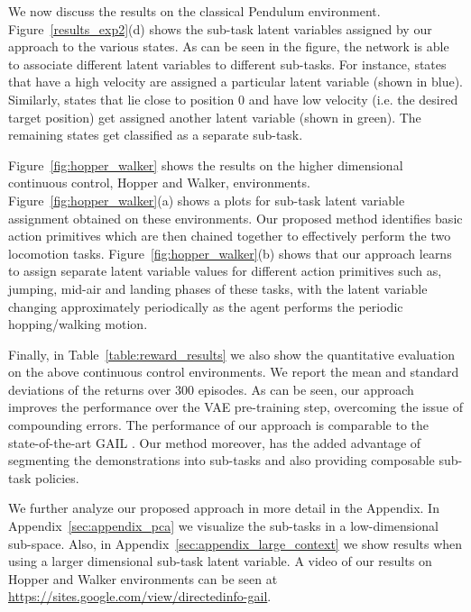\documentclass{article} %
\begin{document}
We now discuss the results on the classical Pendulum environment. Figure~\ref{results_exp2}(d) shows the sub-task latent variables assigned by our approach to the various states. As can be seen in the figure, the network is able to associate different latent variables to different sub-tasks. For instance, states that have a high velocity are assigned a particular latent variable (shown in blue). Similarly, states that lie close to position 0 and have low velocity (i.e. the desired target position) get assigned another latent variable (shown in green). The remaining states get classified as a separate sub-task.

Figure~\ref{fig:hopper_walker} shows the results on the higher dimensional continuous control, Hopper and Walker, environments. 
Figure~\ref{fig:hopper_walker}(a) shows a plots for sub-task latent variable assignment obtained on these environments. Our proposed method identifies basic action primitives which are then chained together to effectively perform the two locomotion tasks. Figure~\ref{fig:hopper_walker}(b) shows that our approach learns to assign separate latent variable values for different action primitives such as, jumping, mid-air and landing phases of these tasks, with the latent variable changing approximately periodically as the agent performs the periodic hopping/walking motion.

Finally, in Table~\ref{table:reward_results} we also show the quantitative evaluation on the above continuous control environments. We report the mean and standard deviations of the returns over 300 episodes. As can be seen, our approach improves the performance over the VAE pre-training step, overcoming the issue of compounding errors. The performance of our approach is comparable to the state-of-the-art GAIL \citep{ho2016generative}. Our method moreover, has the added advantage of segmenting the demonstrations into sub-tasks and also providing composable sub-task policies.

We further analyze our proposed approach in more detail in the Appendix. In Appendix~\ref{sec:appendix_pca} we visualize the sub-tasks in a low-dimensional sub-space. Also, in Appendix~\ref{sec:appendix_large_context} we show results when using a larger dimensional sub-task latent variable. A video of our results on Hopper and Walker environments can be seen at \url{https://sites.google.com/view/directedinfo-gail}.
\end{document}

